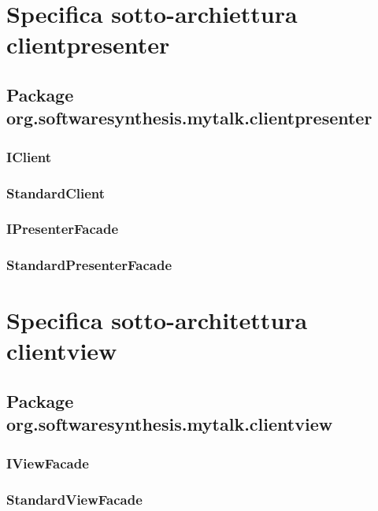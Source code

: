 \clearpage

\section{Specifica sotto-archiettura clientpresenter}\label{clientpresenterarchitecture}

\subsection{Package org.softwaresynthesis.mytalk.clientpresenter}\label{sec:clientpresetner}

\subsubsection{IClient}\label{sec:iclient}

\subsubsection{StandardClient}\label{sec:standardclient}

\subsubsection{IPresenterFacade}\label{sec:ipresenterfacade}

\subsubsection{StandardPresenterFacade}\label{sec:standardserverfacade}

\clearpage

\section{Specifica sotto-architettura clientview}\label{sec:clientviewarchitecture}

\subsection{Package org.softwaresynthesis.mytalk.clientview}\label{sec:clientview}

\subsubsection{IViewFacade}\label{sec:iviewfacade}

\subsubsection{StandardViewFacade}\label{sec:standardviewfacade}

